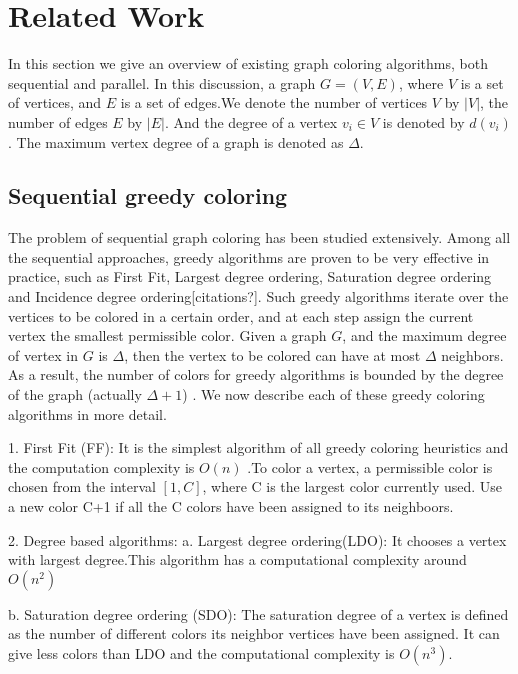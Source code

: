 \documentclass[preprint]{sigplanconf}
\begin{document}
\section{ Related Work}
In this section we give an overview of existing graph coloring algorithms, both sequential and parallel.  In this discussion, a graph $G=(V,E)$, where $V$ is a set of vertices, and $E$ is a set of edges.We denote the number of vertices $V$ by $|V|$, the number of edges $E$ by $|E|$. And the degree of a vertex $v_i \in V$ is denoted by $d(v_i)$. The maximum vertex degree of a graph is denoted as $\Delta$.

\subsection{Sequential greedy coloring}

The problem of sequential graph coloring has been studied extensively. Among all the sequential approaches, greedy algorithms are proven to be very effective in practice, such as First Fit, Largest degree ordering, Saturation degree ordering and Incidence degree ordering[citations?]. Such greedy algorithms iterate over the vertices to be colored in a certain order, and at each step assign the current vertex the smallest permissible color. Given a graph $G$, and the maximum degree of vertex in $G$ is $\Delta$, then the vertex to be colored can have at most $\Delta$ neighbors. As a result, the number of colors for greedy algorithms is bounded by the degree of the graph (actually $\Delta+1$) \cite{allwright1995comparison}.  We now describe each of these greedy coloring algorithms in more detail.

1. First Fit (FF): It is the simplest algorithm of all greedy coloring heuristics and the computation complexity is $O(n)$ \cite{klotz2002graph}.To color a vertex, a permissible color is chosen from the interval $[1,C]$, where C is the largest color currently used. Use a new color C+1 if all the C colors have been assigned to its neighboors.

2. Degree based algorithms:
a. Largest degree ordering(LDO):  It chooses a  vertex with largest degree.This algorithm has a computational complexity around $O(n^2)$ \cite{klotz2002graph}

b. Saturation degree ordering (SDO): The saturation degree of a vertex is defined  as the number of different colors its neighbor vertices have been assigned. It can give less colors than LDO and the computational complexity is $O(n^3)$\cite{klotz2002graph}.
\end{document}
